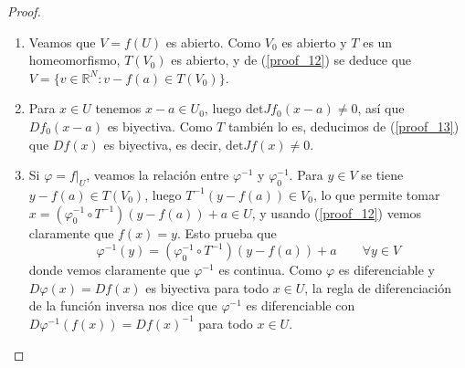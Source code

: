 \documentclass[a4paper, 12pt]{article}
\begin{document}
\begin{enumerate}[label=\textbf{\arabic*}.]
\begin{proof}
\begin{enumerate}[label=(\textit{\roman*})]
\item Veamos que \(V = f(U)\) es abierto. Como \(V_0\) es abierto y \(T\) es un homeomorfismo, \(T (V_0)\) es abierto, y de (\ref{proof_12}) se deduce que \(V = \{v \in \mathbb{R}^N : v - f(a) \in T(V_0)\}\).

\item Para \(x \in U\) tenemos \(x -a \in U_0\), luego \(\text{det}Jf_0 (x-a) \neq 0\), así que \(Df_0 (x-a)\) es biyectiva. Como \(T\) también lo es, deducimos de (\ref{proof_13}) que \(Df(x)\) es biyectiva, es decir, \(\text{det}Jf(x) \neq 0\).

\item Si \(\varphi = f |_U\), veamos la relación entre \(\varphi^{-1}\) y \(\varphi_0^{-1}\). Para \( y \in V\) se tiene \(y - f(a) \in T(V_0)\), luego \(T^{-1} (y - f(a)) \in V_0\), lo que permite tomar \( x = (\varphi_0^{-1} \circ T^{-1}) ( y - f(a)) + a \in U\), y usando (\ref{proof_12}) vemos claramente que \(f(x) = y\). Esto prueba que
\[
	\varphi^{-1} (y) = ( \varphi_0^{-1} \circ T^{-1} ) (y - f(a)) + a \qquad \forall y \in V
\]
donde vemos claramente que \(\varphi^{-1}\) es continua. Como \(\varphi\) es diferenciable y \(D \varphi (x) = Df(x)\) es biyectiva para todo \(x \in U\), la regla de diferenciación de la función inversa nos dice que \(\varphi^{-1}\) es diferenciable con \(D \varphi^{-1} (f(x)) = Df(x)^{-1}\) para todo \(x \in U\).
\end{enumerate}
\end{proof}

\end{enumerate}
\end{document}
